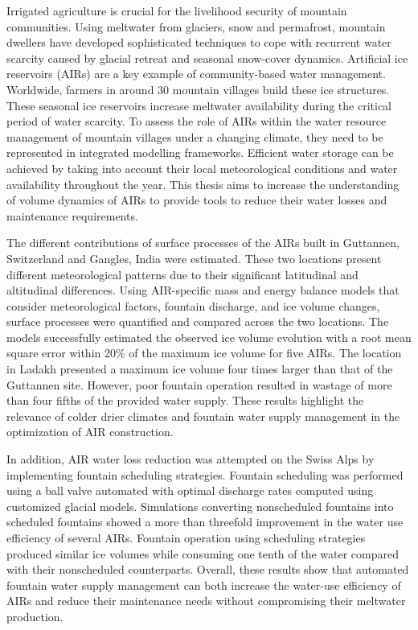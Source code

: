 \label{sec:summary}

Irrigated agriculture is crucial for the livelihood security of mountain communities. Using meltwater from
glaciers, snow and permafrost, mountain dwellers have developed sophisticated techniques to cope with recurrent
water scarcity caused by glacial retreat and seasonal snow-cover dynamics. Artificial ice
reservoirs (AIRs) are a key example of community-based water management. Worldwide, farmers in around 30 mountain
villages build these ice structures. These seasonal ice reservoirs increase meltwater availability during the
critical period of water scarcity. To assess the role of AIRs within the water resource management of
mountain villages under a changing climate, they need to be represented in integrated modelling frameworks.
Efficient water storage can be achieved by taking into account their local meteorological conditions and
water availability throughout the year. This thesis aims to increase the understanding of volume dynamics of
 \ac{AIRs} to provide tools to reduce their water losses and maintenance requirements.

The different contributions of surface processes of the \ac{AIRs} built in Guttannen, Switzerland and  Gangles, India were estimated. These two
locations present different meteorological patterns due to their significant latitudinal and altitudinal
differences. Using \ac{AIR}-specific mass and energy balance models that consider meteorological factors,
fountain discharge, and ice volume changes, surface processes were quantified and compared across the two
locations. The models successfully estimated the observed ice volume evolution with a root mean square
error within 20\% of the maximum ice volume for five \ac{AIRs}. The location in Ladakh presented a maximum ice volume four
times larger than that of the Guttannen site. However, poor fountain operation resulted in wastage of more than
four fifths of the provided water supply. These results highlight the relevance of colder drier climates and
fountain water supply management in the optimization of \ac{AIR} construction.

In addition, \ac{AIR} water loss reduction was attempted on the Swiss Alps by implementing fountain scheduling
strategies. Fountain scheduling was performed using a ball valve automated with optimal discharge
rates computed using customized glacial models. Simulations converting nonscheduled fountains into scheduled
fountains showed a more than threefold improvement in the water use efficiency of several \ac{AIRs}. Fountain
operation using scheduling strategies produced similar ice volumes while consuming one tenth of the water
compared with their nonscheduled counterparts. Overall, these results show that automated fountain water supply
management can both increase the water-use efficiency of \ac{AIRs} and reduce their maintenance needs without
compromising their meltwater production.

